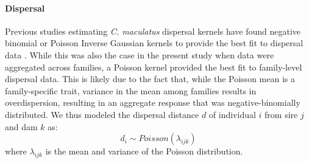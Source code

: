 \paragraph{Dispersal}
Previous studies estimating \textit{C. maculatus} dispersal kernels have found negative binomial or Poisson Inverse Gaussian kernels to provide the best fit to dispersal data \citep{miller_sex_2013,wagner_genetic_2016,ochocki_rapid_2017}. While this was also the case in the present study when data were aggregated across families, a Poisson kernel provided the best fit to family-level dispersal data. This is likely due to the fact that, while the Poisson mean is a family-specific trait, variance in the mean among families results in overdispersion, resulting in an aggregate response that was negative-binomially distributed. We thus modeled the dispersal distance $d$ of individual $i$ from sire $j$ and dam $k$ as:
%
\begin{equation}\label{corr:dispersal}
  d_{i} \sim \mathit{Poisson}(\lambda_{ijk})
\end{equation}
%
where $\lambda_{ijk}$ is the mean and variance of the Poisson distribution. 


